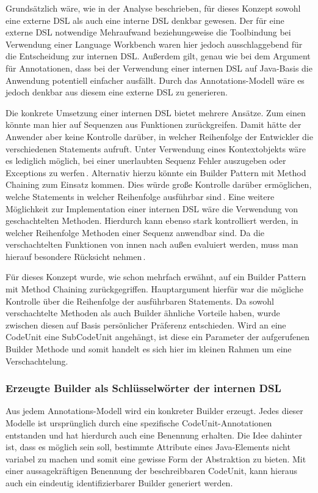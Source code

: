 \documentclass[12pt,oneside,a4paper,parskip]{scrbook}
\begin{document}
Grundsätzlich wäre, wie in der Analyse beschrieben, für dieses Konzept sowohl eine externe DSL als auch eine interne DSL denkbar gewesen. Der für eine externe DSL notwendige Mehraufwand beziehungsweise die Toolbindung bei Verwendung einer Language Workbench waren hier jedoch ausschlaggebend für die Entscheidung zur internen DSL. Außerdem gilt, genau wie bei dem Argument für Annotationen, dass bei der Verwendung einer internen DSL auf Java-Basis die Anwendung potentiell einfacher ausfällt. Durch das Annotations-Modell wäre es jedoch denkbar aus diesem eine externe DSL zu generieren.

Die konkrete Umsetzung einer internen DSL bietet mehrere Ansätze. Zum einen könnte man hier auf Sequenzen aus Funktionen zurückgreifen. Damit hätte der Anwender aber keine Kontrolle darüber, in welcher Reihenfolge der Entwickler die verschiedenen Statements aufruft. Unter Verwendung eines Kontextobjekts wäre es lediglich möglich, bei einer unerlaubten Sequenz Fehler auszugeben oder Exceptions zu werfen\,\cite[S. 351ff.]{fowler2010}. Alternativ hierzu könnte ein Builder Pattern mit Method Chaining zum Einsatz kommen. Dies würde große Kontrolle darüber ermöglichen, welche Statements in welcher Reihenfolge ausführbar sind\,\cite[S. 343ff.]{fowler2010}. Eine weitere Möglichkeit zur Implementation einer internen DSL wäre die Verwendung von geschachtelten Methoden. Hierdurch kann ebenso stark kontrolliert werden, in welcher Reihenfolge Methoden einer Sequenz anwendbar sind. Da die verschachtelten Funktionen von innen nach außen evaluiert werden, muss man hierauf besondere Rücksicht nehmen\,\cite[S. 357ff.]{fowler2010}.

Für dieses Konzept wurde, wie schon mehrfach erwähnt, auf ein Builder Pattern mit Method Chaining zurückgegriffen. Hauptargument hierfür war die mögliche Kontrolle über die Reihenfolge der ausführbaren Statements. Da sowohl verschachtelte Methoden als auch Builder ähnliche Vorteile haben, wurde zwischen diesen auf Basis persönlicher Präferenz entschieden. Wird an eine CodeUnit eine SubCodeUnit angehängt, ist diese ein Parameter der aufgerufenen Builder Methode und somit handelt es sich hier im kleinen Rahmen um eine Verschachtelung.

\subsubsection{Erzeugte Builder als Schlüsselwörter der internen DSL}

Aus jedem Annotations-Modell wird ein konkreter Builder erzeugt. Jedes dieser Modelle ist ursprünglich durch eine spezifische CodeUnit-Annotationen entstanden und hat hierdurch auch eine Benennung erhalten. Die Idee dahinter ist, dass es möglich sein soll, bestimmte Attribute eines Java-Elements nicht variabel zu machen und somit eine gewisse Form der Abstraktion zu bieten. Mit einer aussagekräftigen Benennung der beschreibbaren CodeUnit, kann hieraus auch ein eindeutig identifizierbarer Builder generiert werden.
\end{document}
